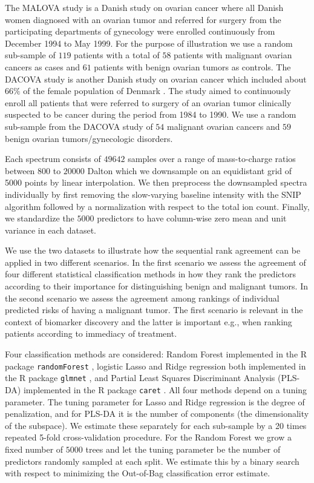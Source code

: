 \documentclass[oupdraft]{bio}
\begin{document}
The MALOVA study is a Danish study on ovarian cancer
\citep{Hogdall:2004:Cancer:15160342} where all Danish women diagnosed
with an ovarian tumor and referred for surgery from the participating
departments of gynecology were enrolled continuously from December
1994 to May 1999. For the purpose of illustration we use a random
sub-sample of $119$ patients with a total of $58$ patients with
malignant ovarian cancers as cases and $61$ patients with benign
ovarian tumors as controls. The DACOVA study is another
Danish study on ovarian cancer which included about
$66\%$ of the female population of Denmark
\citep{bertelsen1991protocol}. The study aimed to continuously enroll
all patients that were referred to surgery of an ovarian tumor
clinically suspected to be cancer during the period from 1984 to
1990. We use a random sub-sample from the DACOVA study of $54$
malignant ovarian cancers and $59$ benign ovarian tumors/gynecologic
disorders.

Each spectrum consists of $49642$ samples over a range of mass-to-charge ratios
between $800$ to $20000$ Dalton which we downsample on an equidistant grid of
5000 points by linear interpolation. We then preprocess the downsampled
spectra individually by first removing the slow-varying baseline intensity
with the SNIP algorithm \citep{ryan1988snip} followed by a
normalization with respect to the total ion count. Finally, we standardize
the $5000$ predictors to have column-wise zero mean and unit variance in
each dataset.

We use the two datasets to illustrate how the sequential rank
agreement can be applied in two different scenarios. In the first
scenario we assess the agreement of four different statistical
classification methods in how they rank the predictors according to
their importance for distinguishing benign and malignant tumors. In
the second scenario we assess the agreement among rankings of
individual predicted risks of having a malignant tumor. The first
scenario is relevant in the context of biomarker discovery and the
latter is important e.g., when ranking patients according to immediacy of
treatment.

Four classification methods are considered: Random Forest
\citep{breiman2001random} implemented in the R package
\texttt{randomForest} \citep{liaw2002classification}, logistic Lasso
\citep{tibshirani1996regression} and Ridge regression
\citep{segerstedt1992ordinary} both implemented in the R package
\texttt{glmnet} \citep{friedman2010regularization}, and Partial Least
Squares Discriminant Analysis (PLS-DA) \citep{boulesteix2004pls}
implemented in the R package \texttt{caret} \citep{Jed-Wing:2014aa}.
%
All four methods depend on a tuning parameter. The tuning parameter for
Lasso and Ridge regression is the degree of penalization, and for PLS-DA
it is the number of components (the dimensionality of the subspace).
We estimate these separately for each sub-sample by a 20 times repeated
5-fold cross-validation procedure. For the Random Forest we grow a fixed
number of $5000$ trees and let the tuning parameter be the number of
predictors randomly sampled at each split. We estimate this by a binary
search with respect to minimizing the Out-of-Bag classification error estimate.
\end{document}
